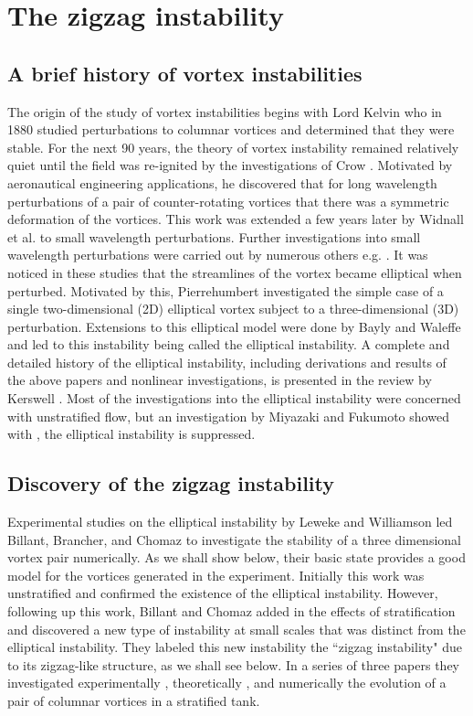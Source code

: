 \section{The zigzag instability}
\subsection{A brief history of vortex instabilities}

The origin of the study of vortex instabilities begins with Lord Kelvin who in 1880 studied perturbations to columnar vortices and determined that they were stable. For the next 90 years, the theory of vortex instability remained relatively quiet until the field was re-ignited by the investigations of Crow \cite{crow1970}. Motivated by aeronautical engineering applications, he discovered that for long wavelength perturbations of a pair of counter-rotating vortices that there was a symmetric deformation of the vortices. This work was extended a few years later by Widnall et al. \cite{widnall1974} to small wavelength perturbations. Further investigations into small wavelength perturbations were carried out by numerous others e.g. \cite{moore1975,tsai1976}. It was noticed in these studies that the streamlines of the vortex became elliptical when perturbed. Motivated by this, Pierrehumbert \cite{pierrehumbert1986} investigated the simple case of a single two-dimensional (2D) elliptical vortex subject to a three-dimensional (3D) perturbation. Extensions to this elliptical model were done by Bayly \cite{baily1986} and Waleffe \cite{waleffe1990} and led to this instability being called the elliptical instability. A complete and detailed history of the elliptical instability, including derivations and results of the above papers and nonlinear investigations, is presented in the review by Kerswell \cite{kerswell2002}. Most of the investigations into the elliptical instability were concerned with unstratified flow, but an investigation by Miyazaki and Fukumoto \cite{miyazakifukumoto1992} showed with , the elliptical instability is suppressed. 

\subsection{Discovery of the zigzag instability}
Experimental studies  on the elliptical instability by Leweke and Williamson \cite{leweke1998} led Billant, Brancher, and Chomaz \cite{bc1999} to investigate the stability of a three dimensional vortex pair numerically. As we shall show below, their basic state provides a good model for the vortices generated in the experiment. Initially this work was unstratified and confirmed the existence of the elliptical instability. However, following up this work, Billant and Chomaz added in the effects of stratification and discovered a new type of instability at small scales that was distinct from the elliptical instability. They labeled this new instability the ``zigzag instability" due to its zigzag-like structure, as we shall see below. In a series of three papers they investigated experimentally \cite{bc2000a}, theoretically \cite{bc2000b}, and numerically \cite{bc2000c} the evolution of a pair of columnar vortices in a stratified tank.

